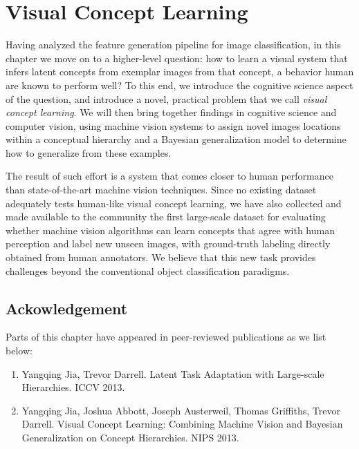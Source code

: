 \chapter{Visual Concept Learning}

Having analyzed the feature generation pipeline for image classification, in this chapter we move on to a higher-level question: how to learn a visual system that infers latent concepts from exemplar images from that concept, a behavior human are known to perform well? To this end, we introduce the cognitive science aspect of the question, and introduce a novel, practical problem that we call \emph{visual concept learning}. We will then bring together findings in cognitive science and computer vision, using machine vision systems to assign novel images locations within a conceptual hierarchy and a Bayesian generalization model to determine how to generalize from these examples.

The result of such effort is a system that comes closer to human performance than state-of-the-art machine vision techniques. Since no existing dataset adequately tests human-like visual concept learning, we have also collected and made available to the community the first large-scale dataset for evaluating whether machine vision algorithms can learn concepts that agree with human perception and label new unseen images, with ground-truth labeling directly obtained from human annotators. We believe that this new task provides challenges beyond the conventional object classification paradigms.



\section*{Ackowledgement}
Parts of this chapter have appeared in peer-reviewed publications as we list below:
\begin{enumerate}
\item Yangqing Jia, Trevor Darrell. Latent Task Adaptation with Large-scale Hierarchies. ICCV 2013.
\item Yangqing Jia, Joshua Abbott, Joseph Austerweil, Thomas Griffiths, Trevor Darrell. Visual Concept Learning: Combining Machine Vision and Bayesian Generalization on Concept Hierarchies. NIPS 2013.
\end{enumerate}
